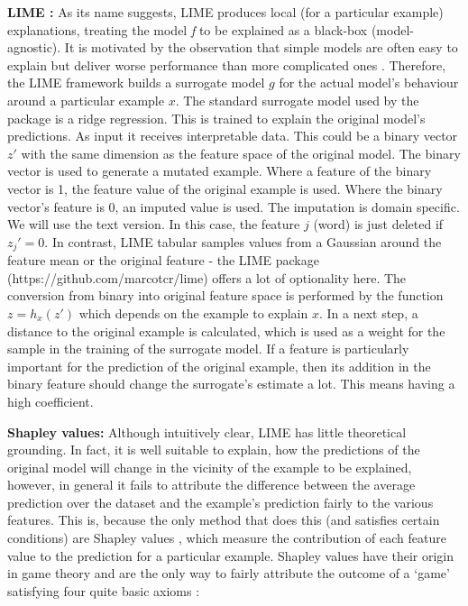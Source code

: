 \documentclass[msc,deptreport,ai]{infthesis} %
\begin{document}
	\textbf{LIME \cite{ribeiro_why_2016}:} As its name suggests, \gls{LIME} produces local (for a particular example) explanations, treating the model \textit{f} to be explained as a black-box (model-agnostic). It is motivated by the observation that simple models are often easy to explain but deliver worse performance than more complicated ones \cite{ribeiro_why_2016}. Therefore, the \gls{LIME} framework builds a surrogate model $g$ for the actual model's behaviour around a particular example $x$. The standard surrogate model used by the package is a ridge regression. This is trained to explain the original model's predictions. As input it receives interpretable data. This could be a binary vector $z'$ with the same dimension as the feature space of the original model. The binary vector is used to  generate a mutated example. Where a feature of the binary vector is 1, the feature value of the original example is used. Where the binary vector's feature is 0, an imputed value is used. The imputation is domain specific. We will use the text version. In this case, the feature $j$ (word) is just deleted if $z_j' = 0$. In contrast, \gls{LIME} tabular samples values from a Gaussian around the feature mean or the original feature - the \gls{LIME} package (https://github.com/marcotcr/lime) offers a lot of optionality here. The conversion from binary into original feature space is performed by the function $z = h_x(z')$ which depends on the example to explain $x$. In a next step, a distance to the original example is calculated, which is used as a weight for the sample in the training of the surrogate model. If a feature is particularly important for the prediction of the original example, then its addition in the binary feature should change the surrogate's estimate a lot. This means having a high coefficient.
	
	\textbf{Shapley values:} Although intuitively clear, \gls{LIME} has little theoretical grounding. In fact, it is well suitable to explain, how the predictions of the original model will change in the vicinity of the example to be explained, however, in general it fails to attribute the difference between the average prediction over the dataset and the example's prediction fairly to the various features. This is, because the only method that does this (and satisfies certain conditions) are Shapley values \cite{shapley_value_1953}, which measure the contribution of each feature value to the prediction for a particular example. Shapley values have their origin in game theory and are the only way to fairly attribute the outcome of a `game' satisfying four quite basic axioms \cite[supplement]{lundberg_unified_2017}:
	
\end{document}
